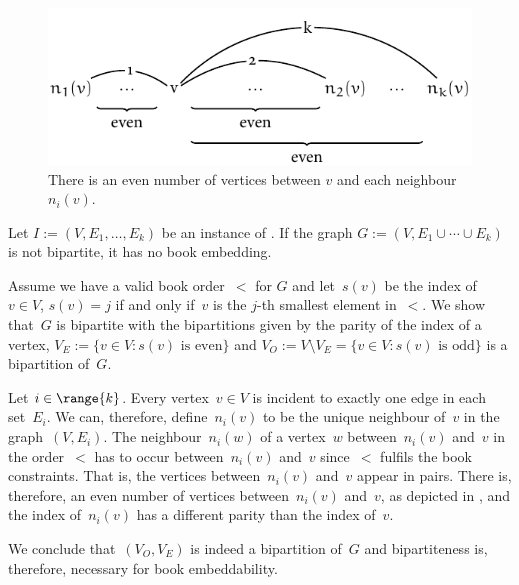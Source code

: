 \begin{figure}\centering
    \includegraphics{figures/t_bipartite}
    \caption[Embeddable perfect matchings have to be bipartite]{There is an even number of vertices between $v$ and each neighbour $n_i(v)$.}
    \label{figure:bipartite}
\end{figure}

\begin{theorem}
\label{lemma:bipartite}
Let $I := (V, E_1,\dotsc, E_k)$ be an instance of \probMatching. If the graph
$G := (V, E_1 \cup \dotsb \cup E_k)$ is not bipartite, it has no book embedding.
\end{theorem}
\begin{myproof}
Assume we have a valid book order~$<$ for $G$ and let~$s(v)$ be the index of~$v \in V$,
\ie $s(v) = j$ if and only if~$v$ is the $j$-th smallest element in~$<$. We show that~$G$
is bipartite with the bipartitions given by the parity of the index of a vertex,
\ie $V_E := \bigl\{v \in V\colon \text{$s(v)$ is even}\bigr\}$ and $V_O := V \setminus V_E = \bigl\{v \in V\colon \text{$s(v)$ is odd}\bigr\}$ is a bipartition of~$G$.

Let $i \in \range{k}$.
Every vertex~$v\in V$ is incident to exactly one edge in each set~$E_i$. 
We can, therefore, define~$n_i(v)$ to be the unique neighbour of~$v$ in the graph~$(V, E_i)$.
The neighbour~$n_i(w)$ of a vertex~$w$ between~$n_i(v)$ and~$v$ in the order~$<$ has to
occur between~$n_i(v)$ and~$v$ since~$<$ fulfils the book constraints. That is,
the vertices between~$n_i(v)$ and~$v$ appear in pairs. There is, therefore, an even number 
of vertices between~$n_i(v)$ and~$v$, as depicted in , and the index of~$n_i(v)$ has a different parity than the index of~$v$.

We conclude that~$(V_O, V_E)$ is indeed a bipartition of~$G$ and bipartiteness is, therefore, necessary
for book embeddability.
\end{myproof}

